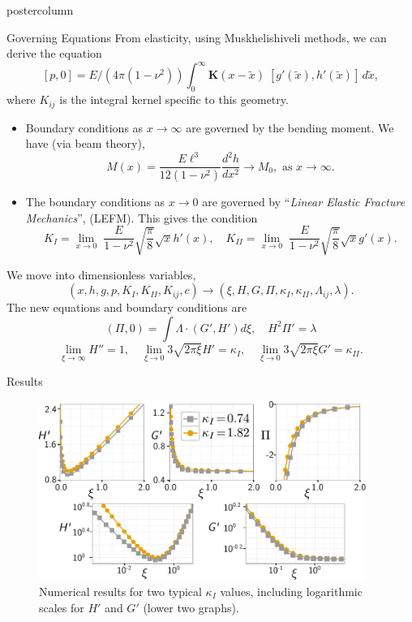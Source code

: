 \documentclass{beamer}
\begin{document}
\begin{frame}
\begin{columns}
\begin{column}{.43\textwidth}
\begin{beamercolorbox}[center]{postercolumn}
\begin{minipage}{.98\textwidth}
{\begin{myblock}{Governing Equations}
From elasticity, using Muskhelishiveli methods, we can derive the equation
\[
\left[ p,  0 \right]   =
E/(4\pi (1-\nu^2)) \int_0^{\infty}
\textbf{K}(x-\tilde{x}) \;
\left[ g'(\tilde{x}) , h'(\tilde{x}) \right] \, d\tilde{x},  \]
where $K_{ij}$ is the integral kernel specific to this geometry.
\begin{itemize}
\item Boundary conditions as $x\to\infty$ are governed by the bending moment.
      We have (via beam theory), 
      \[ M(x) = \frac{E\ell^3}{12(1-\nu^2)}\frac{d^2h}{dx^2} \to M_0,
        \mbox{ as } x \to \infty. \]
\item The boundary conditions as $x\to0$ are governed by ``\emph{Linear Elastic
      Fracture Mechanics}'', (LEFM). This gives the condition
      \[K_I = \lim_{x\to 0} \; \frac{E}{1-\nu^2}\sqrt{\frac{\pi}{8}} \sqrt{x}
      h'(x), \quad K_{II} = \lim_{x\to 0} \; \frac{E}{1-\nu^2}
      \sqrt{\frac{\pi}{8}} \sqrt{x} g'(x). \]
\end{itemize}
We move into dimensionless variables, 
\[(x,h,g,p,K_I,K_{II},K_{ij},c) \to (\xi, H,G,\Pi, \kappa_{I},\kappa_{II}, 
\Lambda_{ij},\lambda). \]
The new equations and boundary conditions are
\[(\Pi,0) = \int \Lambda \cdot (G',H') d\xi, \quad H^2\Pi' = \lambda\]
\[\lim_{\xi \to \infty} H'' = 1, \quad \lim_{\xi \to 0} 3\sqrt{2\pi\xi}H' 
= \kappa_I,  \quad \lim_{\xi \to 0} 3\sqrt{2\pi\xi}G' 
= \kappa_{II}. \]
\end{myblock}\vfill
\begin{myblock}{Results}
\begin{figure}
\centering\includegraphics[width=0.95\textwidth]{hprime-p-x-full-poster.pdf}
\caption{Numerical results for two typical $\kappa_I$ values, including
         logarithmic scales for $H'$ and $G'$ (lower two graphs).}
\end{figure}
\end{myblock}\vfill
}
\end{minipage}
\end{beamercolorbox}
\end{column}
\end{columns}
\end{frame}
\end{document}
